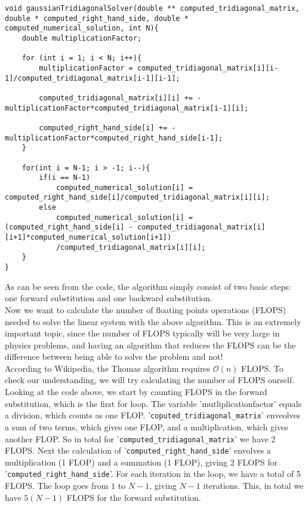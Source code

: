\documentclass{article}
\begin{document}
\begin{lstlisting}
void gaussianTridiagonalSolver(double ** computed_tridiagonal_matrix, double * computed_right_hand_side, double * computed_numerical_solution, int N){
	double multiplicationFactor;
	
	for (int i = 1; i < N; i++){
		multiplicationFactor = computed_tridiagonal_matrix[i][i-1]/computed_tridiagonal_matrix[i-1][i-1];

		computed_tridiagonal_matrix[i][i] += - multiplicationFactor*computed_tridiagonal_matrix[i-1][i];

		computed_right_hand_side[i] += - multiplicationFactor*computed_right_hand_side[i-1];
	}
	
	for(int i = N-1; i > -1; i--){
		if(i == N-1)
			computed_numerical_solution[i] = computed_right_hand_side[i]/computed_tridiagonal_matrix[i][i];
		else
			computed_numerical_solution[i] = (computed_right_hand_side[i] - computed_tridiagonal_matrix[i][i+1]*computed_numerical_solution[i+1])
			/computed_tridiagonal_matrix[i][i];
	}
}
\end{lstlisting}

As can be seen from the code, the algorithm simply consist of two basic steps: one forward substitution and one backward substitution.\\

Now we want to calculate the number of floating points operations (FLOPS) needed to solve the linear system with the above algorithm. This is an extremely important topic, since the number of FLOPS typically will be very large in physics problems, and having an algorithm that reduces the FLOPS can be the difference between being able to solve the problem and not!\\

According to Wikipedia, the Thomas algorithm requires $\mathcal{O}(n)$ FLOPS. To check our understanding, we will try calculating the number of FLOPS ourself.\\
 
Looking at the code above, we start by caunting FLOPS in the forward substitution, which is the first for loop. The variable 'mutliplicationfactor' equals a division, which counts as one FLOP. '\texttt{coputed\_tridiagonal\_matrix}' enveolves a sum of two terms, which gives one FLOP, and a multiplication, which gives another FLOP. So in total for '\texttt{computed\_tridiagonal\_matrix}' we have 2 FLOPS. Next the calculation of '\texttt{computed\_right\_hand\_side}' envolves a multiplication (1 FLOP) and a summation (1 FLOP), giving 2 FLOPS for '\texttt{computed\_right\_hand\_side}'. For each iteration in the loop, we have a total of 5 FLOPS. The loop goes from $1$ to $N-1$, giving $N-1$ iterations. This, in total we have $5(N-1)$ FLOPS for the forward substitution.\\
\end{document}
